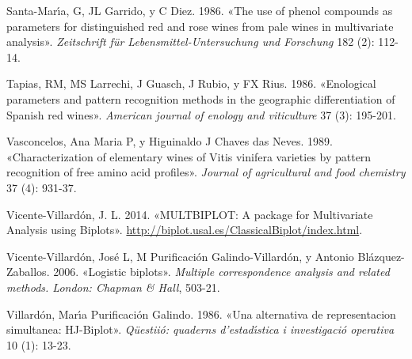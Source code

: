 \documentclass[
  10pt,
  spanish,
]{article}
\begin{document}
\leavevmode\hypertarget{ref-santa1986}{}%
Santa-Marı́a, G, JL Garrido, y C Diez. 1986. «The use of phenol compounds
as parameters for distinguished red and rose wines from pale wines in
multivariate analysis». \emph{Zeitschrift für Lebensmittel-Untersuchung
und Forschung} 182 (2): 112-14.

\leavevmode\hypertarget{ref-tapias1986}{}%
Tapias, RM, MS Larrechi, J Guasch, J Rubio, y FX Rius. 1986. «Enological
parameters and pattern recognition methods in the geographic
differentiation of Spanish red wines». \emph{American journal of enology
and viticulture} 37 (3): 195-201.

\leavevmode\hypertarget{ref-vasconcelos1989}{}%
Vasconcelos, Ana Maria P, y Higuinaldo J Chaves das Neves. 1989.
«Characterization of elementary wines of Vitis vinifera varieties by
pattern recognition of free amino acid profiles». \emph{Journal of
agricultural and food chemistry} 37 (4): 931-37.

\leavevmode\hypertarget{ref-vicente2014Multbiplot}{}%
Vicente-Villardón, J. L. 2014. «MULTBIPLOT: A package for Multivariate
Analysis using Biplots».
\url{http://biplot.usal.es/ClassicalBiplot/index.html}.

\leavevmode\hypertarget{ref-vicente2006}{}%
Vicente-Villardón, José L, M Purificación Galindo-Villardón, y Antonio
Blázquez-Zaballos. 2006. «Logistic biplots». \emph{Multiple
correspondence analysis and related methods. London: Chapman \& Hall},
503-21.

\leavevmode\hypertarget{ref-villardon1986}{}%
Villardón, Marı́a Purificación Galindo. 1986. «Una alternativa de
representacion simultanea: HJ-Biplot». \emph{Qüestiió: quaderns
d'estadı́stica i investigació operativa} 10 (1): 13-23.
\end{document}
